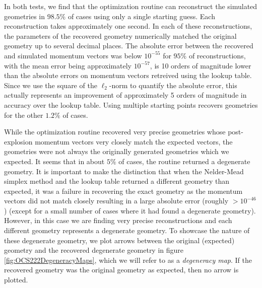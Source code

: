 In both tests, we find that the optimization routine can reconstruct the simulated geometries in $98.5\%$ of cases using only a single starting guess. Each reconstruction takes approximately one second. In each of these reconstructions, the parameters of the recovered geometry numerically matched the original geometry up to several decimal places. The absolute error between the recovered and simulated momentum vectors was below $10^{-55}$ for $95\%$ of reconstructions, with the mean error being approximately $10^{-57}$, is 10 orders of magnitude lower than the absolute errors on momentum vectors retreived using the lookup table. Since we use the square of the $\ell_2$-norm to quantify the absolute error, this actually represents an improvement of approximately 5 orders of magnitude in accuracy over the lookup table. Using multiple starting points recovers geometries for the other $1.2\%$ of cases.

While the optimization routine recovered very precise geometries whose post-explosion momentum vectors very closely match the expected vectors, the geometries were not always the originally generated geometries which we expected. It seems that in about $5\%$ of cases, the routine returned a degenerate geometry. It is important to make the distinction that when the Nelder-Mead simplex method and the lookup table returned a different geometry than expected, it was a failure in recovering the exact geometry as the momentum vectors did not match closely resulting in a large absolute error (roughly $>10^{-46}$) (except for a small number of cases where it had found a degenerate geometry). However, in this case we are finding very precise reconstructions and each different geometry represents a degenerate geometry. To showcase the nature of these degenerate geometry, we plot arrows between the original (expected) geometry and the recovered degenerate geometry in figure \ref{fig:OCS222DegeneracyMaps}, which we will refer to as a \emph{degeneracy map}. If the recovered geometry was the original geometry as expected, then no arrow is plotted.

